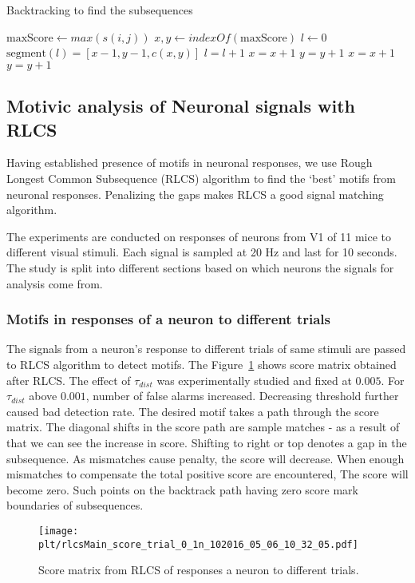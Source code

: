 \documentclass[MTech]{iitmdiss}
\newcommand{\plt}{thesis_plots}
\begin{document}
\begin{algorithm}
\caption{Backtracking to find the subsequences}
\label{backtrack_algo}
\begin{algorithmic}[1]
    \State $\text{maxScore} \gets max(s(i, j))$
    \State $ x, y \gets indexOf(\text{maxScore})$
    \State $l \gets 0$
        \State $\text{segment} (l) = [x - 1, y - 1, c (x, y) ]$
        \State $l = l + 1$
            \State $x = x + 1$
            \State $y = y + 1$
            \State $x = x + 1$
        \Else
            \State $y = y + 1$
        \EndIf
    \EndWhile
  \EndFunction
\end{algorithmic}
\end{algorithm}
\subsection{Motivic analysis of Neuronal signals with RLCS} %
\label{sub:motivic_analysis_of_neuronal_signals_with_rlcs}
Having established presence of motifs in neuronal responses, we use Rough Longest Common Subsequence (RLCS) algorithm to find the `best' motifs from neuronal responses. Penalizing the gaps makes RLCS a good signal matching algorithm.

The experiments are conducted on responses of neurons from V1 of 11 mice to different visual stimuli. Each signal is sampled at 20 Hz and last for 10 seconds. The study is split into different sections based on which neurons the signals for analysis come from.
\subsubsection{Motifs in responses of a neuron to different trials} %
\label{ssub:motifs_in_responses_of_a_neuron_to_different_trials}
The signals from a neuron's response to different trials of same stimuli are passed to RLCS algorithm to detect motifs. The Figure~\ref{img:score_trial} shows score matrix obtained after RLCS. The effect of $\tau_{dist}$ was experimentally studied and fixed at $0.005$. For $\tau_{dist}$ above $0.001$, number of false alarms increased. Decreasing threshold further caused bad detection rate. The desired motif takes a path through the score matrix. The diagonal shifts in the score path are sample matches - as a result of that we can see the increase in score. Shifting to right or top denotes a gap in the subsequence. As mismatches cause penalty, the score will decrease. When enough mismatches to compensate the total positive score are encountered, The score will become zero. Such points on the backtrack path having zero score mark boundaries of subsequences.
\begin{figure}[h]
    \centering
    \texttt{[image: \\plt/rlcsMain\_score\_trial\_0\_1n\_102016\_05\_06\_10\_32\_05.pdf]}
    \caption{Score matrix from RLCS of responses a neuron to different trials.}
    \label{img:score_trial}
\end{figure}
\end{document}
